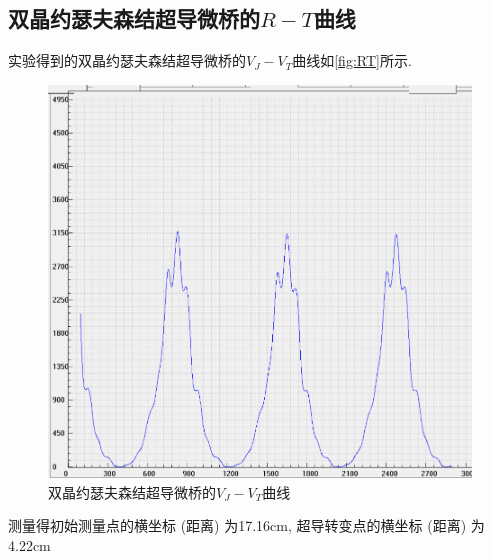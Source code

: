 \documentclass[font=default]{mpltx}
\newcommand{\note}[1]{{\color{gray}#1}}
\newcommand*\cs[1]{\texttt{\textbackslash #1}}
\newcommand*\env[1]{\textit{\texttt{#1}}}
\begin{document}
\subsection{双晶约瑟夫森结超导微桥的$R-T$曲线}
实验得到的双晶约瑟夫森结超导微桥的$V_J-V_T$曲线如\autoref{fig:RT}所示.
\begin{figure}
  \centering
  \includegraphics[width=0.85\linewidth]{fig/3.png}
  \caption{双晶约瑟夫森结超导微桥的$V_J-V_T$曲线}
  \label{fig:RT}
\end{figure}

测量得初始测量点的横坐标 (距离) 为17.16cm, 超导转变点的横坐标 (距离) 为4.22cm





\end{document}
